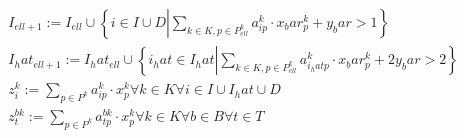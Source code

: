 \begin{align}
  & I_{\mathit{ell} + 1} := I_{\mathit{ell}} \cup \left\{i \in I \cup D \left|\right. \sum_{k \in K, p \in P_{\mathit{ell}}^{k}} a_{\mathit{ip}}^{k} \cdot x_bar_{p}^{k} + y_bar > 1\right\} \tag{eq\_0023\_a} \\
  & I_hat_{\mathit{ell} + 1} := I_hat_{\mathit{ell}} \cup \left\{i_hat \in I_hat \left|\right. \sum_{k \in K, p \in P_{\mathit{ell}}^{k}} a_{i_hat p}^{k} \cdot x_bar_{p}^{k} + 2 y_bar > 2\right\} \tag{eq\_0023\_b} \\
  & z_{i}^{k} := \sum_{p \in P^{k}} a_{\mathit{ip}}^{k} \cdot x_{p}^{k} \forall k \in K \forall i \in I \cup I_hat \cup D \tag{eq\_0024\_a} \\
  & z_{t}^{\mathit{bk}} := \sum_{p \in P^{k}} a_{\mathit{tp}}^{\mathit{bk}} \cdot x_{p}^{k} \forall k \in K \forall b \in B \forall t \in T \tag{eq\_0024\_b} \\
\end{align}
